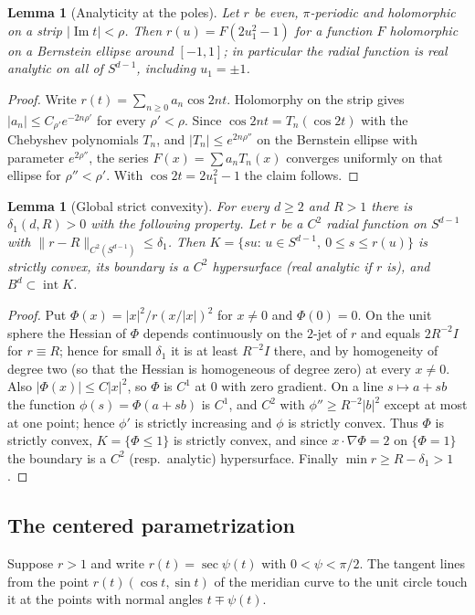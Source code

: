 \documentclass[11pt]{amsart}
\numberwithin{equation}{section}
\newtheorem{lemma}[theorem]{Lemma}
\theoremstyle{definition}
\theoremstyle{remark}
\newcommand{\abs}[1]{\lvert #1\rvert}
\newcommand{\norm}[1]{\lVert #1\rVert}
\begin{document}
\begin{lemma}[Analyticity at the poles]\label{lem:poles}
Let $r$ be even, $\pi$-periodic and holomorphic on a strip $\abs{\operatorname{Im}t}<\rho$. Then $r(u)=F(2u_1^2-1)$ for a function $F$ holomorphic on a Bernstein ellipse around $[-1,1]$; in particular the radial function is real analytic on all of $S^{d-1}$, including $u_1=\pm1$.
\end{lemma}

\begin{proof}
Write $r(t)=\sum_{n\ge0}a_n\cos 2nt$. Holomorphy on the strip gives $\abs{a_n}\le C_{\rho'}e^{-2n\rho'}$ for every $\rho'<\rho$. Since $\cos2nt=T_n(\cos2t)$ with the Chebyshev polynomials $T_n$, and $\abs{T_n}\le e^{2n\rho''}$ on the Bernstein ellipse with parameter $e^{2\rho''}$, the series $F(x)=\sum a_nT_n(x)$ converges uniformly on that ellipse for $\rho''<\rho'$. With $\cos2t=2u_1^2-1$ the claim follows.
\end{proof}

\begin{lemma}[Global strict convexity]\label{lem:convex}
For every $d\ge2$ and $R>1$ there is $\delta_1(d,R)>0$ with the following property. Let $r$ be a $C^2$ radial function on $S^{d-1}$ with $\norm{r-R}_{C^2(S^{d-1})}\le\delta_1$. Then $K=\{su:\,u\in S^{d-1},\ 0\le s\le r(u)\}$ is strictly convex, its boundary is a $C^2$ hypersurface \textup{(}real analytic if $r$ is\textup{)}, and $B^d\subset\operatorname{int}K$.
\end{lemma}

\begin{proof}
Put $\Phi(x)=\abs x^2/r(x/\abs x)^2$ for $x\ne0$ and $\Phi(0)=0$. On the unit sphere the Hessian of $\Phi$ depends continuously on the $2$-jet of $r$ and equals $2R^{-2}I$ for $r\equiv R$; hence for small $\delta_1$ it is at least $R^{-2}I$ there, and by homogeneity of degree two (so that the Hessian is homogeneous of degree zero) at every $x\ne0$. Also $\abs{\Phi(x)}\le C\abs x^2$, so $\Phi$ is $C^1$ at $0$ with zero gradient. On a line $s\mapsto a+sb$ the function $\phi(s)=\Phi(a+sb)$ is $C^1$, and $C^2$ with $\phi''\ge R^{-2}\abs b^2$ except at most at one point; hence $\phi'$ is strictly increasing and $\phi$ is strictly convex. Thus $\Phi$ is strictly convex, $K=\{\Phi\le1\}$ is strictly convex, and since $x\cdot\nabla\Phi=2$ on $\{\Phi=1\}$ the boundary is a $C^2$ (resp.\ analytic) hypersurface. Finally $\min r\ge R-\delta_1>1$.
\end{proof}

\subsection{The centered parametrization}
Suppose $r>1$ and write $r(t)=\sec\psi(t)$ with $0<\psi<\pi/2$. The tangent lines from the point $r(t)(\cos t,\sin t)$ of the meridian curve to the unit circle touch it at the points with normal angles $t\mp\psi(t)$.
\end{document}
